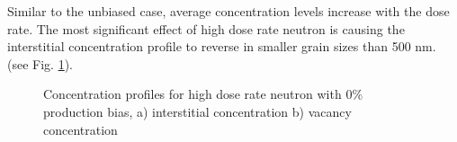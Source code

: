 \documentclass[a4paper]{article}
\begin{document}
    Similar to the unbiased case, average concentration levels increase with the dose rate. The most significant effect of high dose rate neutron is causing the interstitial concentration profile to reverse in smaller grain sizes than 500 nm. (see Fig. \ref{figure:concentrations_neutron_5_1e-3}).\\
    \begin{figure}[htb!]  %
      \centering
      \qquad
      \caption{Concentration profiles for high dose rate neutron with 0\% production bias, a) interstitial concentration b) vacancy concentration}
      \label{figure:concentrations_neutron_5_1e-3}
    \end{figure}
\end{document}
